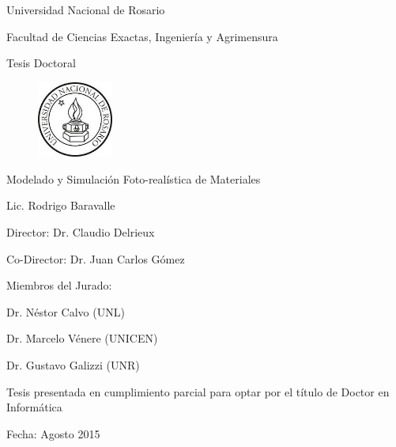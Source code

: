 
\begin{titlepage}
\begin{center}

Universidad Nacional de Rosario

Facultad de Ciencias Exactas, Ingeniería y Agrimensura

Tesis Doctoral

\begin{figure}[h!]
\centering
\includegraphics[width=2.5cm]{figures/logounr}
\end{figure}

\vspace{2cm}


{\huge Modelado y Simulación Foto-realística de Materiales}
\vspace{2cm}

{\large Lic. Rodrigo Baravalle}
\vspace{2cm}

{\large Director: Dr. Claudio Delrieux}

{\large Co-Director: Dr. Juan Carlos Gómez}

\vspace{2cm}
{\large Miembros del Jurado:}

{\large Dr. Néstor Calvo (UNL)}

{\large Dr. Marcelo Vénere (UNICEN)}

{\large Dr. Gustavo Galizzi (UNR)}

\vspace{2cm}
{\large Tesis presentada en cumplimiento parcial para optar por el título de Doctor en Informática}

\vspace{1cm}
Fecha: Agosto 2015
\end{center}
\end{titlepage}

